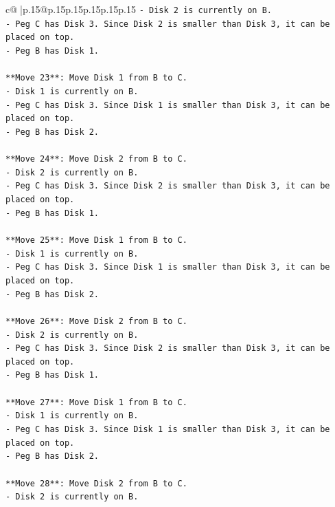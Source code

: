 \documentclass{article}
\begin{document}
{\begin{supertabular}{c@{$\;$}|p{.15\linewidth}@{}p{.15\linewidth}p{.15\linewidth}p{.15\linewidth}p{.15\linewidth}p{.15\linewidth}}
{{{\texttt{{-} Disk 2 is currently on B.} \\
\texttt{{-} Peg C has Disk 3. Since Disk 2 is smaller than Disk 3, it can be placed on top.} \\
\texttt{{-} Peg B has Disk 1.} \\
\\ 
\texttt{**Move 23**: Move Disk 1 from B to C.} \\
\texttt{{-} Disk 1 is currently on B.} \\
\texttt{{-} Peg C has Disk 3. Since Disk 1 is smaller than Disk 3, it can be placed on top.} \\
\texttt{{-} Peg B has Disk 2.} \\
\\ 
\texttt{**Move 24**: Move Disk 2 from B to C.} \\
\texttt{{-} Disk 2 is currently on B.} \\
\texttt{{-} Peg C has Disk 3. Since Disk 2 is smaller than Disk 3, it can be placed on top.} \\
\texttt{{-} Peg B has Disk 1.} \\
\\ 
\texttt{**Move 25**: Move Disk 1 from B to C.} \\
\texttt{{-} Disk 1 is currently on B.} \\
\texttt{{-} Peg C has Disk 3. Since Disk 1 is smaller than Disk 3, it can be placed on top.} \\
\texttt{{-} Peg B has Disk 2.} \\
\\ 
\texttt{**Move 26**: Move Disk 2 from B to C.} \\
\texttt{{-} Disk 2 is currently on B.} \\
\texttt{{-} Peg C has Disk 3. Since Disk 2 is smaller than Disk 3, it can be placed on top.} \\
\texttt{{-} Peg B has Disk 1.} \\
\\ 
\texttt{**Move 27**: Move Disk 1 from B to C.} \\
\texttt{{-} Disk 1 is currently on B.} \\
\texttt{{-} Peg C has Disk 3. Since Disk 1 is smaller than Disk 3, it can be placed on top.} \\
\texttt{{-} Peg B has Disk 2.} \\
\\ 
\texttt{**Move 28**: Move Disk 2 from B to C.} \\
\texttt{{-} Disk 2 is currently on B.} \\
}}}
\end{supertabular}}
\end{document}
